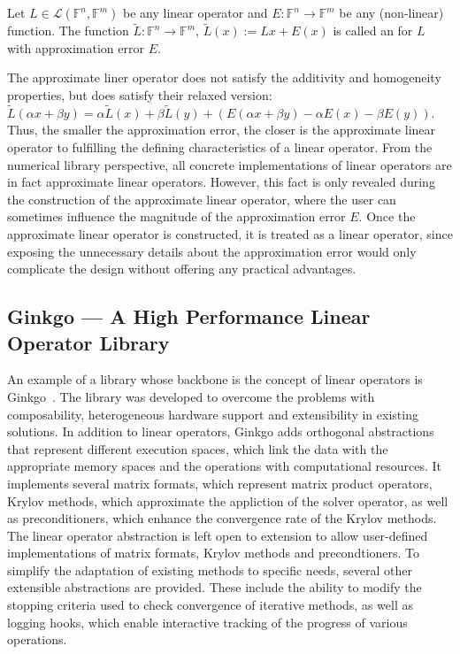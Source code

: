 \begin{definition}
\label{conclusion:def:apprximate-linop}
Let $L \in \mathcal{L}(\mathbb{F}^n,\mathbb{F}^m)$ be any linear operator and $E
: \mathbb{F}^n \rightarrow \mathbb{F}^m$ be any (non-linear) function.
The function $\widetilde{L} : \mathbb{F}^n \rightarrow \mathbb{F}^m$,
$\widetilde{L}(x) := Lx + E(x)$ is called an  for $L$ with approximation error $E$.
\end{definition}

The approximate liner operator does not satisfy the additivity and homogeneity
properties, but does satisfy their relaxed version: $\widetilde{L}(\alpha x +
\beta y) = \alpha \widetilde{L}(x) + \beta \widetilde{L}(y) +
(E(\alpha x + \beta y) - \alpha E(x) - \beta E(y))$. Thus, the smaller the
approximation error, the closer is the approximate linear operator to
fulfilling the defining characteristics of a linear operator.
From the numerical library perspective, all concrete implementations of linear
operators are in fact approximate linear operators. However, this fact is only
revealed during the construction of the approximate linear operator, where the
user can sometimes influence the magnitude of the approximation error $E$. Once
the approximate linear operator is constructed, it is treated as a linear
operator, since exposing the unnecessary details about the approximation error
would only complicate the design without offering any practical advantages.


\subsection{Ginkgo --- A High Performance Linear Operator Library}

An example of a library whose backbone is the concept of linear operators is
Ginkgo~\cite{ginkgo}. The library was developed to overcome the problems with
composability, heterogeneous hardware support and extensibility in existing
solutions. In addition to linear operators, Ginkgo adds orthogonal abstractions
that represent different execution spaces, which link the data with the
appropriate memory spaces and the operations with computational resources. It
implements several matrix formats, which represent matrix product
operators, Krylov methods, which approximate the appliction of
the solver operator, as well as preconditioners, which enhance the convergence
rate of the Krylov methods. The linear operator abstraction is left open to
extension to allow user-defined implementations of matrix formats, Krylov
methods and precondtioners. To simplify the adaptation of existing methods to
specific needs, several other extensible abstractions are provided. These
include the ability to modify the stopping criteria used to check convergence of
iterative methods, as well as logging hooks, which enable interactive tracking
of the progress of various operations.

